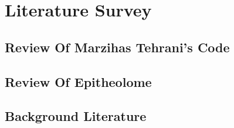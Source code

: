 
\chapter{Literature Survey} %

\label{Chapter3} %

\section{Review Of Marzihas Tehrani's Code}

\section{Review Of Epitheolome}

\section{Background Literature}
